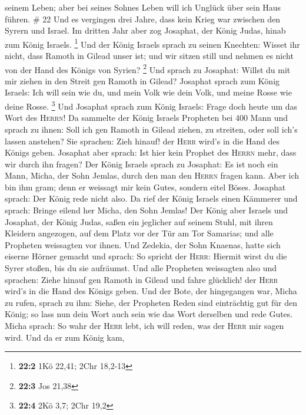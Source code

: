 seinem Leben; aber bei seines Sohnes Leben will ich Unglück über sein
Haus führen. \# 22  Und es vergingen drei Jahre, dass kein
Krieg war zwischen den Syrern und Israel.  Im dritten Jahr
aber zog Josaphat, der König Judas, hinab zum König Israels. \footnote{\textbf{22:2}
  1Kö 22,41; 2Chr 18,2-13}  Und der König Israels sprach
zu seinen Knechten: Wisset ihr nicht, dass Ramoth in Gilead unser ist;
und wir sitzen still und nehmen es nicht von der Hand des Königs von
Syrien? \footnote{\textbf{22:3} Jos 21,38}  Und sprach zu
Josaphat: Willst du mit mir ziehen in den Streit gen Ramoth in Gilead?
Josaphat sprach zum König Israels: Ich will sein wie du, und mein Volk
wie dein Volk, und meine Rosse wie deine Rosse. \footnote{\textbf{22:4}
  2Kö 3,7; 2Chr 19,2}  Und Josaphat sprach zum König
Israels: Frage doch heute um das Wort des \textsc{Herrn}! 
Da sammelte der König Israels Propheten bei 400 Mann und sprach zu
ihnen: Soll ich gen Ramoth in Gilead ziehen, zu streiten, oder soll
ich's lassen anstehen? Sie sprachen: Zieh hinauf! der \textsc{Herr}
wird's in die Hand des Königs geben.  Josaphat aber
sprach: Ist hier kein Prophet des \textsc{Herrn} mehr, dass wir durch
ihn fragen?  Der König Israels sprach zu Josaphat: Es ist
noch ein Mann, Micha, der Sohn Jemlas, durch den man den \textsc{Herrn}
fragen kann. Aber ich bin ihm gram; denn er weissagt mir kein Gutes,
sondern eitel Böses. Josaphat sprach: Der König rede nicht also.
 Da rief der König Israels einen Kämmerer und sprach:
Bringe eilend her Micha, den Sohn Jemlas!  Der König aber
Israels und Josaphat, der König Judas, saßen ein jeglicher auf seinem
Stuhl, mit ihren Kleidern angezogen, auf dem Platz vor der Tür am Tor
Samarias; und alle Propheten weissagten vor ihnen.  Und
Zedekia, der Sohn Knaenas, hatte sich eiserne Hörner gemacht und sprach:
So spricht der \textsc{Herr}: Hiermit wirst du die Syrer stoßen, bis du
sie aufräumst.  Und alle Propheten weissagten also und
sprachen: Ziehe hinauf gen Ramoth in Gilead und fahre glücklich! der
\textsc{Herr} wird's in die Hand des Königs geben.  Und
der Bote, der hingegangen war, Micha zu rufen, sprach zu ihm: Siehe, der
Propheten Reden sind einträchtig gut für den König; so lass nun dein
Wort auch sein wie das Wort derselben und rede Gutes. 
Micha sprach: So wahr der \textsc{Herr} lebt, ich will reden, was der
\textsc{Herr} mir sagen wird.  Und da er zum König kam,
